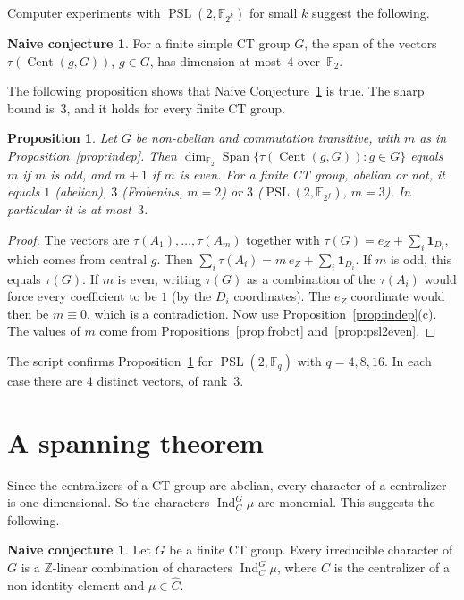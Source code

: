 \documentclass[12pt,letterpaper]{article}
\numberwithin{equation}{section}
\theoremstyle{plain}
\newtheorem{proposition}[theorem]{Proposition}
\theoremstyle{definition}
\newtheorem{naiveconj}[theorem]{Naive conjecture}
\newcommand{\F}{\mathbb{F}}
\newcommand{\Z}{\mathbb{Z}}
\DeclareMathOperator{\Cent}{Cent}
\DeclareMathOperator{\Ind}{Ind}
\DeclareMathOperator{\PSL}{PSL}
\DeclareMathOperator{\Span}{Span}
\newcommand{\triv}{\mathbf{1}}
\begin{document}
Computer experiments with $\PSL(2,\F_{2^k})$ for small $k$ suggest the
following.

\begin{naiveconj}\label{conj:tau}
For a finite simple CT group $G$, the span of the vectors $\tau(\Cent(g,G))$,
$g\in G$, has dimension at most~$4$ over~$\F_2$.
\end{naiveconj}

The following proposition shows that Naive Conjecture~\ref{conj:tau} is true.
The sharp bound is~$3$, and it holds for every finite CT group.

\begin{proposition}\label{prop:taudim}
Let $G$ be non-abelian and commutation transitive, with $m$ as in
Proposition~\ref{prop:indep}. Then $\dim_{\F_2}\Span\{\tau(\Cent(g,G)):g
\in G\}$ equals $m$ if $m$ is odd, and $m+1$ if $m$ is even. For a finite CT
group, abelian or not, it equals $1$ (abelian), $3$ (Frobenius, $m=2$) or $3$
($\PSL(2,\F_{2^f})$, $m=3$). In particular it is at most~$3$.
\end{proposition}

\begin{proof}
The vectors are $\tau(A_1),\dots,\tau(A_m)$ together with
$\tau(G)=e_Z+\sum_i\triv_{D_i}$, which comes from central $g$. Then
$\sum_i\tau(A_i)=m\,e_Z+\sum_i\triv_{D_i}$. If $m$ is odd, this equals
$\tau(G)$. If $m$ is even, writing $\tau(G)$ as a combination of the
$\tau(A_i)$ would force every coefficient to be $1$ (by the $D_i$
coordinates). The $e_Z$ coordinate would then be $m\equiv0$, which is a
contradiction. Now use Proposition~\ref{prop:indep}(c). The values of $m$
come from Propositions~\ref{prop:frobct} and~\ref{prop:psl2even}.
\end{proof}

The script confirms Proposition~\ref{prop:taudim} for $\PSL(2,\F_q)$ with
$q=4,8,16$. In each case there are $4$ distinct vectors, of rank~$3$.


\section{A spanning theorem}\label{sec:span}

Since the centralizers of a CT group are abelian, every character of a
centralizer is one-dimensional. So the characters $\Ind_C^G\mu$ are
monomial. This suggests the following.

\begin{naiveconj}\label{conj:span}
Let $G$ be a finite CT group. Every irreducible character of $G$ is a
$\Z$-linear combination of characters $\Ind_C^G\mu$, where $C$ is the
centralizer of a non-identity element and $\mu\in\widehat C$.
\end{naiveconj}
\end{document}
